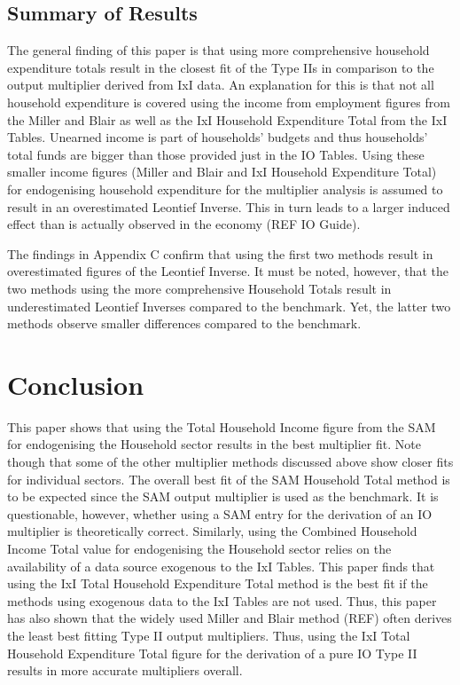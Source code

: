 \begin{doublespacing}
\subsection{Summary of Results}
\label{sec:4.5.4}

The general finding of this paper is that using more comprehensive household expenditure totals result in the closest fit of the Type IIs in comparison to the output multiplier derived from IxI data. An explanation for this is that not all household expenditure is covered using the income from employment figures from the Miller and Blair as well as the IxI Household Expenditure Total from the IxI Tables. Unearned income is part of households’ budgets and thus households’ total funds are bigger than those provided just in the IO Tables. Using these smaller income figures (Miller and Blair and IxI Household Expenditure Total) for endogenising household expenditure for the multiplier analysis is assumed to result in an overestimated Leontief Inverse. This in turn leads to a larger induced effect than is actually observed in the economy (REF IO Guide).

\bigskip

The findings in Appendix C confirm that using the first two methods result in overestimated figures of the Leontief Inverse. It must be noted, however, that the two methods using the more comprehensive Household Totals result in underestimated Leontief Inverses compared to the benchmark. Yet, the latter two methods observe smaller differences compared to the benchmark. 



\newpage
    \section{Conclusion}
\label{sec:4.6}

This paper shows that using the Total Household Income figure from the SAM for endogenising the Household sector results in the best multiplier fit. Note though that some of the other multiplier methods discussed above show closer fits for individual sectors. The overall best fit of the SAM Household Total method is to be expected since the SAM output multiplier is used as the benchmark. It is questionable, however, whether using a SAM entry for the derivation of an IO multiplier is theoretically correct. Similarly, using the Combined Household Income Total value for endogenising the Household sector relies on the availability of a data source exogenous to the IxI Tables. This paper finds that using the IxI Total Household Expenditure Total method is the best fit if the methods using exogenous data to the IxI Tables are not used. Thus, this paper has also shown that the widely used Miller and Blair method (REF) often derives the least best fitting Type II output multipliers. Thus, using the IxI Total Household Expenditure Total figure for the derivation of a pure IO Type II results in more accurate multipliers overall. 


\end{doublespacing}
